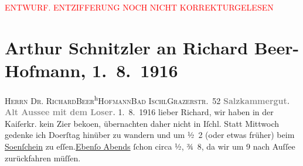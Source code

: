 
\begin{center}
            \textcolor{red}{ENTWURF. ENTZIFFERUNG NOCH NICHT KORREKTURGELESEN}
                      \end{center}
            
               \section[Arthur Schnitzler an Richard Beer-Hofmann, 1. 8. 1916]{ Arthur Schnitzler an Richard Beer-Hofmann, 1. 8. 1916}\nopagebreak{}\rehead{ }\begin{ledgroupsized}[t]{13cm}\normalsize\beginnumbering{} \toendnotes[C]{\smallbreak\pagebreak[2]} 
\pstart{}{\pb}\textsc{Herrn Dr. Richard}\pend{}\pstart{}\textsc{Beer}\substVorne{}\textsuperscript{h}\substDazwischen{}\textsc{H}\substHinten{}\textsc{ofmann}\pend{}\pstart{}\textsc{Bad Ischl}\pend{}\pstart{}\textsc{Grazerstr. 52}\pend{}{\bigskip}\pstart
           \noindent{}\centering{}{\pb}\textcolor{gray}{\textbf{Salzkammergut. Alt Aussee mit dem Loser.}}\pend
           \pstart
           \raggedleft{}{\pb}1. 8. 1916\pend
           \pstart
           lieber Richard, wir haben in der Kaiſerkr. kein Zi{\geminationm}er beko{\geminationm}en, übernachten daher nicht in Iſchl. Statt Mittwoch gedenke ich Do{\geminationn}erſtag hinüber zu wandern und um
                  ½ 2 (oder etwas früher) beim \uline{So{\geminationn}enſchein} zu eſſen.\strikeout{)}{ }\uline{Ebenſo Abends} ſchon circa ½, ¾ 8, da wir
               um 9 nach Auſſee zurückfahren müſſen.

\end{ledgroupsized}

